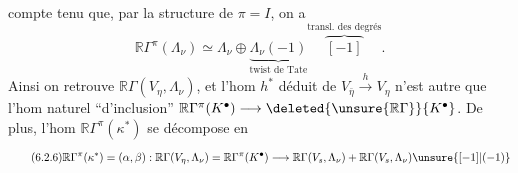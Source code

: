 compte tenu que, par la structure  de $\pi=I$, on a
\[
\tag*{(6.2.5)}\mathbb{R}\Gamma^\pi(\Lambda_\nu)\simeq\Lambda_\nu\oplus\underbrace{\Lambda_\nu(-1)}_{\text{twist de Tate}}\overbrace{[-1]}^{\text{transl. des degrés}}.
\]
Ainsi on retrouve $\mathbb{R}\Gamma(V_\eta,\Lambda_\nu)$, et l'hom $h^*$ déduit de $V_{\bar\eta}\xrightarrow{h}V_\eta$ n'est autre que l'hom naturel ``d'inclusion'' $\mathbb{R}\Gamma^\pi(K^\bullet)\longrightarrow\deleted{\unsure{\mathbb{R}\Gamma}}\{K^\bullet\}$. De plus, l'hom $\mathbb{R}\Gamma^\pi(\kappa^*)$ se décompose en
\[
\tag*{(6.2.6)}\mathbb{R}\Gamma^\pi(\kappa^*)=(\alpha,\beta):\mathbb{R}\Gamma(V_\eta,\Lambda_\nu)=\mathbb{R}\Gamma^\pi(K^\bullet)\longrightarrow\mathbb{R}\Gamma(V_s,\Lambda_\nu)+\mathbb{R}\Gamma(V_s,\Lambda_\nu)\unsure{[-1]|(-1)}
\]
